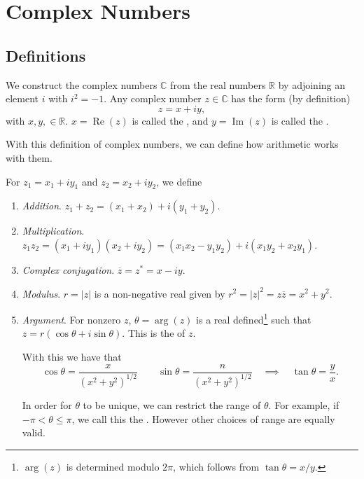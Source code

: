 \documentclass[a4]{scrartcl}
\begin{document}
\clearpage

\section{Complex Numbers}

\subsection{Definitions}

We construct the complex numbers $\mathbb{C}$ from the real numbers $\mathbb{R}$ by adjoining an element $i$ with $i^2 = -1$.
Any complex number $z \in \mathbb{C}$ has the form (by definition)
$$
z = x + iy,
$$
with $x, y, \in \mathbb{R}$. $x = \operatorname{Re}(z)$ is called the , and $y = \operatorname{Im}(z)$ is called the .

With this definition of complex numbers, we can define how arithmetic works with them.

\begin{definition}\label{def:complex-arithmetic}
	For $z_1 = x_1 + i y_1$ and $z_2 = x_2 + i y_2$, we define
\begin{enumerate}[label=(\roman*)]
	\item \emph{Addition}. $z_1 + z_2 = (x_1 + x_2) + i(y_1 + y_2)$.
	\item \emph{Multiplication}. $z_1 z_2 = (x_1 + i y_1)(x_2 + i y_2) = (x_1 x_2 - y_1 y_2) + i(x_1 y_2 + x_2 y_1)$.
	\item \emph{Complex conjugation}. $\overline{z} = z^* = x - iy$.
	\item \emph{Modulus}. $r = |z|$ is a non-negative real given by $r^2 = |z|^2 = z \overline{z} = x^2 + y^2$.
	\item \emph{Argument}. For nonzero $z$, $\theta = \operatorname{arg}(z)$ is a real defined\footnote{$\operatorname{arg}(z)$ is determined modulo $2\pi$, which follows from $\tan \theta = x/y$.} such that $z = r(\cos \theta + i \sin \theta)$. This is the  of $z$.
	
	With this we have that
	$$
	\cos \theta=\frac{x}{\left(x^{2}+y^{2}\right)^{1 / 2}} \quad \quad \sin \theta=\frac{n}{\left(x^{2}+y^{2}\right)^{1 / 2}} \quad \implies  \quad \tan \theta=\frac{y}{x}.
	$$

	In order for $\theta$ to be unique, we can restrict the range of $\theta$. For example, if $-\pi < \theta \leq \pi$, we call this the . However other choices of range are equally valid.
\end{enumerate}
\end{definition}
\end{document}
